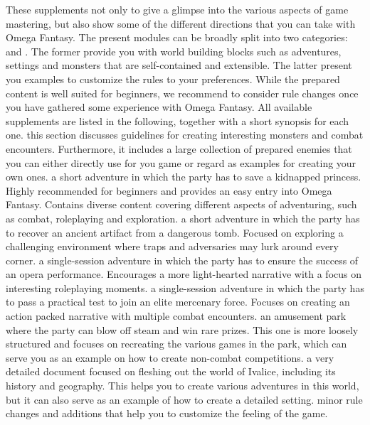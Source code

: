 These supplements not only to give a glimpse into the various aspects of game mastering, but also show some of the different directions that you can take with Omega Fantasy. 
The present modules can be broadly split into two categories:  and .
The former provide you with world building blocks such as adventures, settings and monsters that are self-contained and extensible.
The latter present you examples to customize the rules to your preferences.
While the prepared content is well suited for beginners, we recommend to consider rule changes once you have gathered some experience with Omega Fantasy.
All available supplements are listed in the following, together with a short synopsis for each one.
%
\newpage
%
 this section discusses guidelines for creating interesting monsters and combat encounters.
Furthermore, it includes a large collection of prepared enemies that you can either directly use for you game or regard as examples for creating your own ones.
%
\vfill
%
 a short adventure in which the party has to save a kidnapped princess. 
Highly recommended for beginners and provides an easy entry into Omega Fantasy.
Contains diverse content covering different aspects of adventuring, such as combat, roleplaying and exploration.
%
\vfill
%
 a short adventure in which the party has to recover an ancient artifact from a dangerous tomb.
Focused on exploring a challenging environment where traps and adversaries may lurk around every corner. 
%
\vfill
%
 a single-session adventure in which the party has to ensure the success of an opera performance.
Encourages a more light-hearted narrative with a focus on interesting roleplaying moments.
%
\vfill
%
 a single-session adventure in which the party has to pass a practical test to join an elite mercenary force.
Focuses on creating an action packed narrative with multiple combat encounters.
%
\vfill
%
 an amusement park where the party can blow off steam and win rare prizes. 
This one is more loosely structured and focuses on recreating the various games in the park, which can serve you as an example on how to create non-combat competitions.  
%
\vfill
%
 a very detailed document focused on fleshing out the world of Ivalice, including its history and geography.
This helps you to create various adventures in this world, but it can also serve as an example of how to create a detailed setting.
%
\vfill
%
 minor rule changes and additions that help you to customize the feeling of the game.
